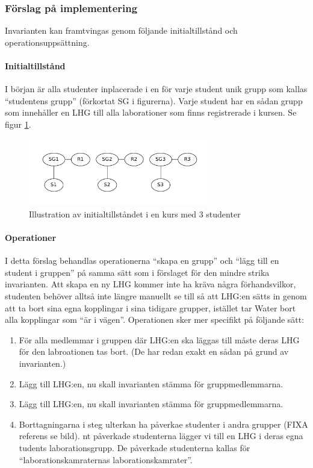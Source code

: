 \subsubsection{Förslag på implementering}
Invarianten kan  framtvingas genom följande initialtillstånd och operationsuppsättning.

\paragraph{Initialtillstånd}
I början är alla studenter inplacerade i en för varje student unik grupp som kallas “studentens grupp” (förkortat SG i figurerna). Varje student har en sådan grupp som innehåller en LHG till alla laborationer som finns registrerade i kursen. Se figur \ref{fig:strict-initstate}.

\begin{figure}
  \centering
  \includegraphics[width=8.0cm]{fig/labgroup/strict_initstate.pdf}
  \caption{Illustration av initialtillståndet i en kurs med 3 studenter}\label{fig:strict-initstate}
\end{figure}

\paragraph{Operationer}
I detta förslag behandlas operationerna “skapa en grupp” och “lägg till en student i gruppen” på samma sätt som i förslaget för den mindre strika invarianten. Att skapa en ny LHG kommer inte ha kräva några förhandsvilkor, studenten behöver alltså inte längre manuellt se till så att LHG:en sätts in genom att ta bort sina egna kopplingar i sina tidigare grupper, istället tar Water bort alla kopplingar som “är i vägen”. Operationen sker mer specifikt på följande sätt:
\begin{enumerate}
  \item För alla medlemmar i gruppen där LHG:en ska läggas till måste deras LHG för den labroationen tas bort.  (De har redan exakt en sådan på grund av invarianten.)
  \item Lägg till LHG:en, nu skall invarianten stämma för gruppmedlemmarna.
  \item Lägg till LHG:en, nu skall invarianten stämma för gruppmedlemmarna.
  \item Borttagningarna i steg ulterkan ha påverkae studenter i andra grupper (FIXA referens se bild). nt påverkade studenterna lägger vi till en LHG i deras egna  tudents laborationsgrupp. De påverkade studenterna kallas för “laborationskamraternas laborationskamrater”. 
\end{enumerate}

